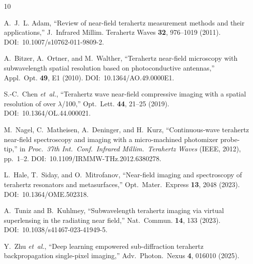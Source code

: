 \documentclass[reprint,superscriptaddress,amsmath,amssymb]{revtex4-2}
\begin{document}
\begin{thebibliography}{10}

A.~J.~L. Adam,
``Review of near-field terahertz measurement methods and their applications,''
J.~Infrared Millim. Terahertz Waves \textbf{32}, 976--1019 (2011).
DOI:~10.1007/s10762-011-9809-2.

A.~Bitzer, A.~Ortner, and M.~Walther,
``Terahertz near-field microscopy with subwavelength spatial resolution based on photoconductive antennas,''
Appl.~Opt. \textbf{49}, E1 (2010).
DOI:~10.1364/AO.49.0000E1.

S.-C.~Chen \textit{et~al.},
``Terahertz wave near-field compressive imaging with a spatial resolution of over $\lambda$/100,''
Opt.~Lett. \textbf{44}, 21--25 (2019).
DOI:~10.1364/OL.44.000021.

M.~Nagel, C.~Matheisen, A.~Deninger, and H.~Kurz,
``Continuous-wave terahertz near-field spectroscopy and imaging with a micro-machined photomixer probe-tip,''
in \textit{Proc.\ 37th Int.\ Conf.\ Infrared Millim.\ Terahertz Waves} (IEEE, 2012), pp.~1--2.
DOI:~10.1109/IRMMW-THz.2012.6380278.

L.~Hale, T.~Siday, and O.~Mitrofanov,
``Near-field imaging and spectroscopy of terahertz resonators and metasurfaces,''
Opt.~Mater.\ Express \textbf{13}, 2048 (2023).
DOI:~10.1364/OME.502318.

A.~Tuniz and B.~Kuhlmey,
``Subwavelength terahertz imaging via virtual superlensing in the radiating near field,''
Nat.~Commun. \textbf{14}, 133 (2023).
DOI:~10.1038/s41467-023-41949-5.

Y.~Zhu \textit{et~al.},
``Deep learning empowered sub-diffraction terahertz backpropagation single-pixel imaging,''
Adv.~Photon.\ Nexus \textbf{4}, 016010 (2025).

\end{thebibliography}
\end{document}
